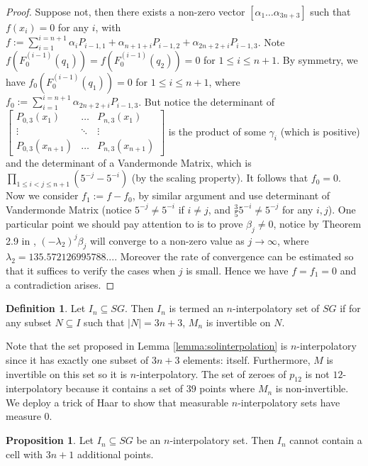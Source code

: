 \documentclass[12pt]{amsart}
\theoremstyle{plain}
\theoremstyle{definition}
\newtheorem{proposition}{Proposition}[section]
\newtheorem{definition}{Definition}[section]
\begin{document}
\begin{proof}
Suppose not, then there exists a  non-zero vector $[\alpha_1\ldots\alpha_{3n+3}]$ such that $f(x_i)=0$ for any $i$, with $f:= \sum\limits^{i=n+1}_{i=1}\alpha_iP_{i-1,1}+\alpha_{n+1+i}P_{i-1,2}+\alpha_{2n+2+i}P_{i-1,3}$. Note $f(F_0^{(i-1)}(q_1))=f(F_0^{(i-1)}(q_2))=0$ for $1\le i \le n+1$. By symmetry, we have $f_0(F_0^{(i-1)}(q_1))=0$ for $1\le i \le n+1$, where $f_0:=\sum\limits^{i=n+1}_{i=1}\alpha_{2n+2+i}P_{i-1,3}$. But notice the determinant of
$\begin{bmatrix}
    P_{0,3}(x_1) & \ldots & P_{n,3}(x_1) \\
    \vdots & \ddots & \vdots \\
    P_{0,3}(x_{n+1}) & \ldots & P_{n,3}(x_{n+1})
\end{bmatrix}$
is the product of some $\gamma_i$ (which is positive) and the determinant of a Vandermonde Matrix, which is $\prod\limits_{1\le i<j\le n+1}(5^{-j}-5^{-i})$ (by the scaling property). It follows that $f_0=0$. Now we consider $f_1:=f-f_0$, by similar argument and use determinant of Vandermonde Matrix (notice $5^{-j}\neq 5^{-i}$ if $i\neq j$, and $\frac35 5^{-i}\neq 5^{-j}$ for any $i,j$). One particular point we should pay attention to is to prove $\beta_j\neq0$, notice by Theorem 2.9 in \cite{NSTY}, $(-\lambda_2)^j\beta_j$ will converge to a non-zero value as $j\rightarrow\infty$, where $\lambda_2=135.572126995788...$. Moreover the rate of convergence can be estimated so that it suffices to verify the cases when $j$ is small. Hence we have $f=f_1=0$ and a contradiction arises.\end{proof}
\begin{definition}
Let $I_n \subseteq SG$. Then $I_n$ is termed an $n$-interpolatory set of $SG$ if for any subset $N \subseteq I$ such that $|N| = 3n + 3$, $M_n$ is invertible on $N$.
\end{definition}

Note that the set proposed in Lemma \ref{lemma:solinterpolation} is $n$-interpolatory since it has exactly one subset of $3n + 3$ elements: itself. Furthermore, $M$ is invertible on this set so it is $n$-interpolatory. The set of zeroes of $p_{12}$ is not $12$-interpolatory because it contains a set of $39$ points where $M_n$ is non-invertible. We deploy a trick of Haar to show that measurable $n$-interpolatory sets have measure 0. 

\begin{proposition}
Let $I_n \subseteq SG$ be an $n$-interpolatory set. Then $I_n$ cannot contain a cell with $3n + 1$ additional points.
\end{proposition}
\end{document}
